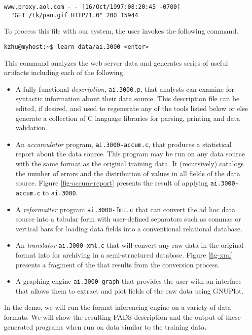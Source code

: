 \documentclass[preprint]{sig-alternate-sigmod08}
\begin{document}
{\small
\begin{verbatim}
www.proxy.aol.com - - [16/Oct/1997:08:20:45 -0700] 
  "GET /tk/pan.gif HTTP/1.0" 200 15944
\end{verbatim}
}

To process this file with our system, the user invokes the 
following command.

{\small
\begin{verbatim}
kzhu@myhost:~$ learn data/ai.3000 <enter>
\end{verbatim}
}

This command analyzes the web server data and generates series
of useful artifacts including each of the following.

\begin{itemize}
\item A fully functional {\em \pads{} description}, {\tt ai.3000.p}, that 
analysts can
examine for syntactic information about their data source.  This description 
file can be edited, if desired, and used to regenerate any of the 
tools listed below or else generate a collection of C language libraries for 
parsing, printing and data validation.
\item An {\em accumulator} program, {\tt ai.3000-accum.c},
that produces a statistical report about the data source.  This
program may be run on any data source with the same format
as the original training data.  It (recursively) catalogs the number of errors
and the distribution of values in all fields of the data source.
Figure \ref{fig-accum-report} presents the result of applying 
{\tt ai.3000-accum.c} to {\tt ai.3000}.
\item A {\em reformatter} program {\tt ai.3000-fmt.c} that can convert 
the ad hoc data source into a tabular form with user-defined separators
such as commas or vertical bars for loading data fields into a conventional
relational database.
\item An {\em \xml{} translator} {\tt ai.3000-xml.c} that will convert
any raw data in the original format into \xml{} for archiving in a 
semi-structured database.  Figure \ref{fig-xml} presents a fragment of
the \xml{} that results from the conversion process.
\item A graphing engine {\tt ai.3000-graph} that provides the user with
an interface that allows them to extract and plot fields of the raw data 
using GNUPlot.
\end{itemize}
In the demo, we will run the format inferencing engine on a variety of
data formats.  We will show the resulting PADS description and the
output of these generated programs when run on data similar to the
training data.
\end{document}
